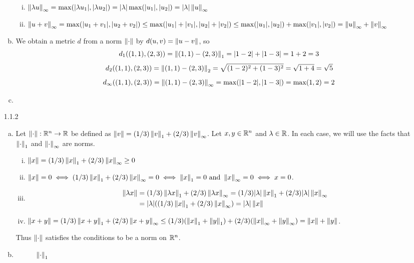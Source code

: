 \documentclass[../../Solutions.tex]{subfiles}
\begin{document}
\begin{itemize}
\begin{enumerate}[(a)]
\begin{enumerate}[(i)]
					\item $\left\lVert\lambda u\right\rVert_\infty = \max(|\lambda u_1|,|\lambda u_2|) = |\lambda|\max(|u_1|,|u_2|) = |\lambda|\left\lVert u\right\rVert_\infty$
					\item $\left\lVert u+v\right\rVert_\infty = \max(|u_1+v_1|,|u_2+v_2|) \leq \max(|u_1|+|v_1|,|u_2|+|v_2|) \leq \max(|u_1|,|u_2|)+\max(|v_1|,|v_2|) = \left\lVert u\right\rVert_\infty+\left\lVert v\right\rVert_\infty$
				\end{enumerate}
			\item We obtain a metric $d$ from a norm $\left\lVert\cdot\right\rVert$ by $d(u,v) = \left\lVert u-v\right\rVert$, so
				$$ d_1((1,1),(2,3)) = \left\lVert(1,1)-(2,3)\right\rVert_1 = |1-2|+|1-3| = 1+2 = 3 $$
				$$ d_2((1,1),(2,3)) = \left\lVert(1,1)-(2,3)\right\rVert_2 = \sqrt{(1-2)^2+(1-3)^2} = \sqrt{1+4} = \sqrt{5} $$
				$$ d_\infty((1,1),(2,3)) = \left\lVert(1,1)-(2,3)\right\rVert_\infty = \max(|1-2|,|1-3|) = \max(1,2) = 2 $$
			\item %
		\end{enumerate}
	
	\item [1.1.2]
		\begin{enumerate}[(a)]
			\item Let $\left\lVert\cdot\right\rVert:\mathbb{R}^n \to \mathbb{R}$ be defined as $\left\lVert v\right\rVert = (1/3)\left\lVert v\right\rVert_1+(2/3)\left\lVert v\right\rVert_\infty$.
				Let $x,y \in \mathbb{R}^n$ and $\lambda \in \mathbb{R}$.
				In each case, we will use the facts that $\left\lVert\cdot\right\rVert_1$ and $\left\lVert\cdot\right\rVert_\infty$ are norms.
				
				\begin{enumerate}[(i)]
					\item $\left\lVert x\right\rVert = (1/3)\left\lVert x\right\rVert_1+(2/3)\left\lVert x\right\rVert_\infty \geq 0$
					\item $\left\lVert x\right\rVert = 0 \iff (1/3)\left\lVert x\right\rVert_1+(2/3)\left\lVert x\right\rVert_\infty = 0 \iff \left\lVert x\right\rVert_1 = 0 \text{ and } \left\lVert x\right\rVert_\infty = 0 \iff x = 0$.
					\item \begin{equation*} \begin{split}
						 \left\lVert\lambda x\right\rVert & = (1/3)\left\lVert\lambda x\right\rVert_1+(2/3)\left\lVert\lambda x\right\rVert_\infty = (1/3)|\lambda|\left\lVert x\right\rVert_1+(2/3)|\lambda|\left\lVert x\right\rVert_\infty \\
							 & = |\lambda|((1/3)\left\lVert x\right\rVert_1+(2/3)\left\lVert x\right\rVert_\infty) = |\lambda|\left\lVert x\right\rVert
					\end{split} \end{equation*}
					\item $\left\lVert x+y\right\rVert = (1/3)\left\lVert x+y\right\rVert_1+(2/3)\left\lVert x+y\right\rVert_\infty \leq (1/3)(\left\lVert x\right\rVert_1+\left\lVert y\right\rVert_1)+(2/3)(\left\lVert x\right\rVert_\infty+\left\lVert y\right\rVert_\infty) = \left\lVert x\right\rVert+\left\lVert y\right\rVert$.
				\end{enumerate}
				Thus $\left\lVert\cdot\right\rVert$ satisfies the conditions to be a norm on $\mathbb{R}^n$.
			\item
				\begin{figure}[h]
					\begin{center}
						\framebox[0.90\textwidth]{
							
						}
					\end{center}
					\caption[]{\label{fig:example_balls_norm_1} $\left\lVert\cdot\right\rVert_1$
					}
				\end{figure}
		\end{enumerate}
	

\end{itemize}
\end{document}
